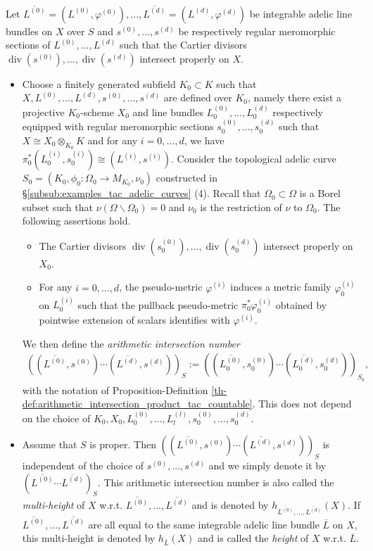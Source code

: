 \documentclass [11pt,reqno]{amsart}
\newcommand{\1}{\mathmybb{1}}
\def\div{\operatorname{div}}
\def\setminus{\smallsetminus}
\begin{document}
\begin{theorem-definition}
\label{th-def:arithmetic_intersection_product_tac}
Let $\overline{L^{(0)}}=(L^{(0)},\varphi^{(0)}),...,\overline{L^{(d)}}=(L^{(d)},\varphi^{(d)})$ be integrable adelic line bundles on $X$ over $S$ and $s^{(0)},...,s^{(d)}$ be respectively regular meromorphic sections of $L^{(0)},...,L^{(d)}$ such that the Cartier divisors $\div(s^{(0)}),...,\div(s^{(d)})$ intersect properly on $X$.
\begin{itemize}
	\item[(1)] Choose a finitely generated subfield $K_{0}\subset K$ such that $X,L^{(0)},...,L^{(d)},s^{(0)},...,s^{(d)}$ are defined over $K_{0}$, namely there exist a projective $K_{0}$-scheme $X_{0}$ and line bundles $L^{(0)}_{0},...,L^{(d)}_{0}$ respectively equipped with regular meromorphic sections $s_{0}^{(0)},...,s_{0}^{(d)}$ such that $X\cong X_{0}\otimes_{K_{0}}K$ and for any $i=0,...,d$, we have $\pi_{0}^{\ast}(L^{(i)}_{0},s_{0}^{(i)})\cong (L^{(i)},s^{(i)})$. Consider the topological adelic curve $S_{0}=(K_{0},\phi_{0}:\Omega_{0}\to M_{K_{0}},\nu_{0})$ constructed in \S \ref{subsub:examples_tac_adelic_curves} (4). Recall that $\Omega_{0}\subset\Omega$ is a Borel subset such that $\nu(\Omega\setminus\Omega_{0})=0$ and $\nu_{0}$ is the restriction of $\nu$ to $\Omega_{0}$. The following assertions hold.
	\begin{itemize}
		\item[(i)] The Cartier divisors $\div(s_{0}^{(0)}),...,\div(s_{0}^{(d)})$ intersect properly on $X_{0}$.
		\item[(ii)] For any $i=0,...,d$, the pseudo-metric $\varphi^{(i)}$ induces a metric family $\varphi^{(i)}_{0}$ on $L_{0}^{(i)}$ such that the pullback pseudo-metric $\pi_{0}^{\ast}\varphi^{(i)}_{0}$ obtained by pointwise extension of scalars identifies with $\varphi^{(i)}$.
	\end{itemize}
	We then define the \emph{arithmetic intersection number}
	\begin{align*}
	\left((\overline{L^{(0)}},s^{(0)})\cdots(\overline{L^{(d)}},s^{(d)})\right)_{S} := \left((\overline{L_{0}^{(0)}},s_{0}^{(0)})\cdots(\overline{L_{0}^{(d)}},s_{0}^{(d)})\right)_{S_{0}},
	\end{align*}
	with the notation of Proposition-Definition \ref{th-def:arithmetic_intersection_product_tac_countable}. This does not depend on the choice of $K_{0},X_{0},L_{0}^{(0)},...,L_{l}^{(l)},s_{0}^{(0)},...,s_{0}^{(d)}$.
	\item[(2)] Assume that $S$ is proper. Then $\left((\overline{L^{(0)}},s^{(0)})\cdots(\overline{L^{(d)}},s^{(d)})\right)_{S}$ is independent of the choice of $s^{(0)},...,s^{(d)}$ and we simply denote it by $\left(\overline{L^{(0)}}\cdots\overline{L^{(d)}}\right)_{S}$. This arithmetic intersection number is also called the \emph{multi-height} of $X$ w.r.t. $\overline{L^{(0)}},...,\overline{L^{(d)}}$ and is denoted by $h_{\overline{L^{(0)}},...,\overline{L^{(d)}}}(X)$. If $\overline{L^{(0)}},...,\overline{L^{(d)}}$ are all equal to the same integrable adelic line bundle $\overline{L}$ on $X$, this multi-height is denoted by $h_{\overline{L}}(X)$ and is called the \emph{height} of $X$ w.r.t. $\overline{L}$.

\end{itemize}
\end{theorem-definition}
\end{document}
